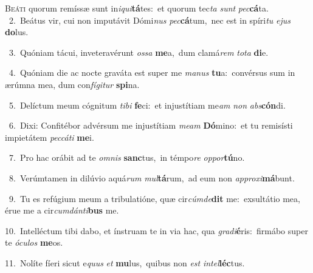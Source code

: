 \lettrine{\initial\textcolor{\initialcolor}{B}}{eáti} quorum remíssæ sunt in\-\textit{i}\-\textit{qui}\textbf{tá}tes:~\star et quorum tec\textit{ta} \textit{sunt} \textit{pec}\-\textbf{cá}ta.\\
{\numbfont\textcolor{\numbcolor}{~2.}}~Beátus vir, cui non imputávit Dómi\textit{nus} \textit{pec}\-\textbf{cá}tum,~\star nec est in spíri\textit{tu} \textit{e}\-\textit{jus} \textbf{do}\-lus.\par
{\numbfont\textcolor{\numbcolor}{~3.}}~Quóniam tácui, inveteravérunt \textit{os}\-\textit{sa} \textbf{me}\-a,~\star dum clamá\textit{rem} \textit{to}\-\textit{ta} \textbf{di}\-e.\par
{\numbfont\textcolor{\numbcolor}{~4.}}~Quóniam die ac nocte graváta est super me \textit{ma}\-\textit{nus} \textbf{tu}\-a:~\star convérsus sum in ærúmna mea, dum con\-\textit{fí}\-\textit{gi}\textit{tur} \textbf{spi}\-na.\par
{\numbfont\textcolor{\numbcolor}{~5.}}~Delíctum meum cógnitum \textit{ti}\-\textit{bi} \textbf{fe}\-ci:~\star et injustítiam me\textit{am} \textit{non} \textit{abs}\-\textbf{cón}di.\par
{\numbfont\textcolor{\numbcolor}{~6.}}~Dixi: Confitébor advérsum me injustítiam \textit{me}\-\textit{am} \textbf{Dó}\-mino:~\star et tu remisísti impietátem \textit{pec}\-\textit{cá}\textit{ti} \textbf{me}\-i.\par
{\numbfont\textcolor{\numbcolor}{~7.}}~Pro hac orábit ad te \textit{om}\-\textit{nis} \textbf{sanc}\-tus,~\star in témpo\textit{re} \textit{op}\-\textit{por}\textbf{tú}no.\par
{\numbfont\textcolor{\numbcolor}{~8.}}~Verúmtamen in dilúvio aquá\textit{rum} \textit{mul}\-\textbf{tá}rum,~\star ad eum non \textit{ap}\-\textit{pro}\textit{xi}\textbf{má}bunt.\par
{\numbfont\textcolor{\numbcolor}{~9.}}~Tu es refúgium meum a tribulatióne, quæ cir\-\textit{cúm}\-\textit{de}\textbf{dit} me:~\star exsultátio mea, érue me a cir\-\textit{cum}\-\textit{dán}\textit{ti}\textbf{bus} me.\par
{\numbfont\textcolor{\numbcolor}{10.}}~Intelléctum tibi dabo, et ínstruam te in via hac, qua \textit{gra}\-\textit{di}\textbf{é}ris:~\star firmábo super te \textit{ó}\-\textit{cu}\textit{los} \textbf{me}\-os.\par
{\numbfont\textcolor{\numbcolor}{11.}}~Nolíte fíeri sicut e\textit{quus} \textit{et} \textbf{mu}\-lus,~\star quibus non \textit{est} \textit{in}\-\textit{tel}\textbf{léc}tus.\par
